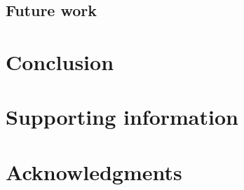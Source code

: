 \documentclass[10pt,letterpaper]{article}
\begin{document}




%

\subsection{Future work}
%


\section*{Conclusion}



\section*{Supporting information}


\section*{Acknowledgments}

\nolinenumbers

%
%
\end{document}
